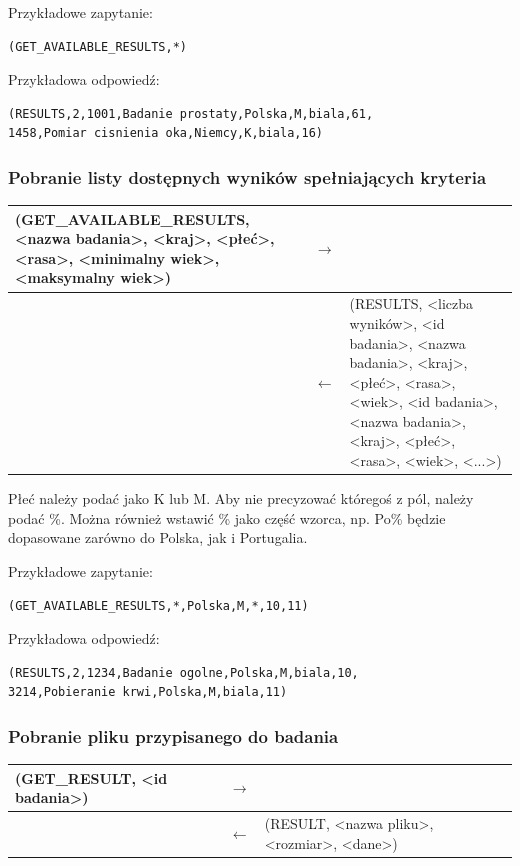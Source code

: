 Przykładowe zapytanie:
\begin{lstlisting}[style=incode]
(GET_AVAILABLE_RESULTS,*)
\end{lstlisting}
Przykładowa odpowiedź:
\begin{lstlisting}[style=incode]
(RESULTS,2,1001,Badanie prostaty,Polska,M,biala,61,
1458,Pomiar cisnienia oka,Niemcy,K,biala,16)
\end{lstlisting}

\subsubsection{Pobranie listy dostępnych wyników spełniających kryteria}

\begin{longtable}{| p{} | p{}| p{} |} 
\hline
(GET\_AVAILABLE\_RESULTS, <nazwa badania>, <kraj>, <płeć>, <rasa>, <minimalny wiek>, <maksymalny wiek>) & $\rightarrow$ &  \\ \hline
 & $\leftarrow$ & (RESULTS, <liczba wyników>, <id badania>, <nazwa badania>, <kraj>, <płeć>, <rasa>, <wiek>, <id badania>, <nazwa badania>, <kraj>, <płeć>, <rasa>, <wiek>, <...>) \\ \hline
\end{longtable}

Płeć należy podać jako K lub M.
Aby nie precyzować któregoś z pól, należy podać \%. Można również wstawić \% jako część wzorca, np. Po\% będzie dopasowane zarówno do Polska, jak i Portugalia.

Przykładowe zapytanie:
\begin{lstlisting}[style=incode]
(GET_AVAILABLE_RESULTS,*,Polska,M,*,10,11)
\end{lstlisting}
Przykładowa odpowiedź:
\begin{lstlisting}[style=incode]
(RESULTS,2,1234,Badanie ogolne,Polska,M,biala,10,
3214,Pobieranie krwi,Polska,M,biala,11)
\end{lstlisting}

\subsubsection{Pobranie pliku przypisanego do badania}

\begin{longtable}{| p{} | p{}| p{} |} 
\hline
(GET\_RESULT, <id badania>) & $\rightarrow$ &  \\ \hline
 & $\leftarrow$ & (RESULT, <nazwa pliku>, <rozmiar>, <dane>) \\ \hline
\end{longtable}

